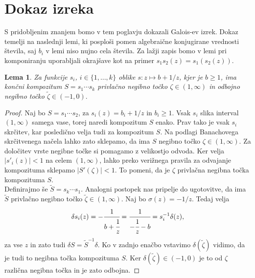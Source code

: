 \documentclass[a4paper,12pt]{article}
\newtheorem{lema}{Lema}
\newenvironment{dokaz}[1][Dokaz]{\begin{proof}}{\end{proof}}
\begin{document}

\section{Dokaz izreka}

S pridobljenim znanjem bomo v tem poglavju dokazali Galois-ev izrek. Dokaz temelji na naslednji lemi, ki posploši pomen algebraične konjugirane vrednosti števila, saj $b_i$ v lemi niso nujno cela števila. Za lažji zapis bomo v lemi pri komponiranju uporabljali okrajšave kot na primer $s_1s_2(z) = s_1(s_2(z)).$

\begin{lema}
    Za funkcije $s_i$, $i \in \{1, \ldots, k\}$ oblike $s : z \mapsto b + 1/z$, kjer je $b \geq 1$, ima končni kompozitum $S = s_1 \cdots s_k$ privlačno negibno točko $\zeta \in (1, \infty)$ in odbojno negibno točko $\tilde{\zeta} \in (-1, 0).$ 
\end{lema}
\begin{dokaz}
    Naj bo $S = s_1 \cdots s_2$, za $s_i(z) = b_i + 1/z$ in $b_i \geq 1$. Vsak $s_i$ slika interval $(1, \infty)$ samega vase, torej naredi kompozitum $S$ enako. Prav tako je vsak $s_i$ skrčitev, kar posledično velja tudi za kompozitum $S$. Na podlagi Banachovega skrčitvenega načela lahko zato sklepamo, da ima $S$ negibno točko $\zeta \in (1, \infty)$. Za določitev vrste negibne točke si pomagamo z velikostjo odvoda. Ker velja $|s'_i(z)| < 1$ na celem $(1, \infty)$, lahko preko verižnega pravila za odvajanje kompozituma sklepamo $|S'(\zeta)| < 1$. To pomeni, da je $\zeta$ privlačna negibna točka kompozituma $S$.\\
    Definirajmo še $\tilde{S} = s_k \cdots s_1$. Analogni postopek nas pripelje do ugotovitve, da ima $\tilde{S}$ privlačno negibno točko $\tilde{\zeta} \in (1, \infty)$. Naj bo $\sigma(z) = -1/z$. Tedaj velja
    \[
        \delta s_i (z) = - \cfrac{1}{b + \cfrac{1}{z}} = \cfrac{1}{-\cfrac{1}{z} - b} = s^{-1}_i \delta (z),
    \]
    za vse $z$ in zato tudi $\delta S = \tilde{S}^{-1} \delta$. Ko v zadnjo enačbo vstavimo $\delta (\tilde{\zeta})$ vidimo, da je tudi to negibna točka kompozituma $S$. Ker $\delta (\tilde{\zeta}) \in (-1, 0)$ je to od $\zeta$ različna negibna točka in je zato odbojna.
\end{dokaz}
\end{document}
